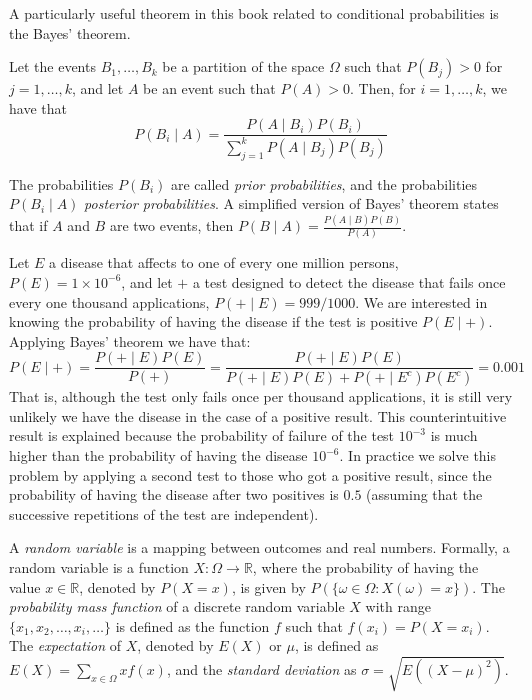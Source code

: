 A particularly useful theorem in this book related to conditional probabilities is the Bayes' theorem.

\begin{theorem}
\label{th:bayes}
Let the events $B_1, \ldots, B_k$ be a partition of the space $\Omega$ such that $P(B_j) > 0$ for $j = 1, \ldots, k$, and let $A$ be an event such that $P(A) > 0$. Then, for $i = 1, \ldots, k$, we have that
\[
P(B_i \mid A) = \frac{P(A \mid B_i) P(B_i)}{\sum_{j=1}^{k} P(A \mid B_j) P(B_j)}
\]
\end{theorem}

The probabilities $P(B_i)$ are called \emph{prior probabilities}, and the probabilities $P(B_i \mid A)$ \emph{posterior probabilities}. A simplified version of Bayes' theorem states that if $A$ and $B$ are two events, then $P(B \mid A) = \frac{P(A \mid B) P(B)}{P(A)}$.

\begin{example}
Let $E$ a disease that affects to one of every one million persons, $P(E) = 1 \times 10^{-6}$, and let $+$ a test designed to detect the disease that fails once every one thousand applications, $P(+ \mid E) = 999/1000$. We are interested in knowing the probability of having the disease if the test is positive $P(E \mid +)$. Applying Bayes' theorem we have that:
\[
P(E \mid +) = \frac{P(+ \mid E) P(E)}{P(+)} = \frac{P(+ \mid E) P(E)}{P(+ \mid E) P(E) + P(+ \mid E^c) P(E^c)} = 0.001
\]
That is, although the test only fails once per thousand applications, it is still very unlikely we have the disease in the case of a positive result. This counterintuitive result is explained because the probability of failure of the test $10^{-3}$ is much higher than the probability of having the disease $10^{-6}$. In practice we solve this problem by applying a second test to those who got a positive result, since the probability of having the disease after two positives is $0.5$ (assuming that the successive repetitions of the test are independent).
\end{example}

A \emph{random variable} is a mapping between outcomes and real numbers. Formally, a random variable is a function $X : \Omega \rightarrow \mathbb{R}$, where the probability of having the value $x \in \mathbb{R}$, denoted by $P(X=x)$, is given by $P(\{ \omega \in \Omega : X(\omega) = x\})$. The \emph{probability mass function} of a discrete random variable $X$ with range $\{ x_1, x_2, \ldots, x_i, \ldots \}$ is defined as the function $f$ such that $f(x_i) = P(X=x_i)$. The \emph{expectation} of $X$, denoted by $E(X)$ or $\mu$, is defined as $E(X) = \sum_{x \in \Omega} x f(x)$, and the \emph{standard deviation} as $\sigma = \sqrt{E \left( (X - \mu)^2 \right)}$.

